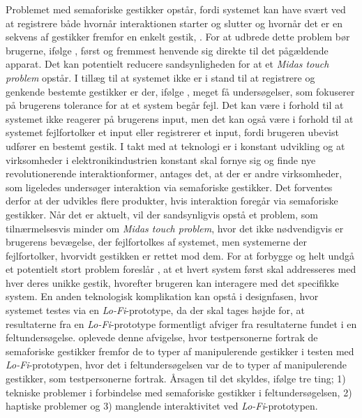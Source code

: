Problemet med semaforiske gestikker opstår, fordi systemet kan have svært ved at registrere både hvornår interaktionen starter og slutter og hvornår det er en sekvens af gestikker fremfor en enkelt gestik, \parencite[s. 27]{PDF:ATaxonomyOfGestures}. For at udbrede dette problem bør brugerne, ifølge \textcite[s. 1]{PDF:DoThatThere}, først og fremmest henvende sig direkte til det pågældende apparat. Det kan potentielt reducere sandsynligheden for at et \textit{Midas touch problem} opstår. I tillæg til at systemet ikke er i stand til at registrere og genkende bestemte gestikker er der, ifølge \textcite[s. 37]{PDF:ATaxonomyOfGestures}, meget få undersøgelser, som fokuserer på brugerens tolerance for at et system begår fejl. Det kan være i forhold til at systemet ikke reagerer på brugerens input, men det kan også være i forhold til at systemet fejlfortolker et input eller registrerer et input, fordi brugeren ubevist udfører en bestemt gestik. \blankline
%
I takt med at teknologi er i konstant udvikling og at virksomheder i elektronikindustrien konstant skal fornye sig og finde nye revolutionerende interaktionformer, antages det, at der er andre virksomheder, som ligeledes undersøger interaktion via semaforiske gestikker. Det forventes derfor at der udvikles flere produkter, hvis interaktion foregår via semaforiske gestikker. Når det er aktuelt, vil der sandsynligvis opstå et problem, som tilnærmelsesvis minder om \textit{Midas touch problem}, hvor det ikke nødvendigvis er brugerens bevægelse, der fejlfortolkes af systemet, men systemerne der fejlfortolker, hvorvidt gestikken er rettet mod dem. For at forbygge og helt undgå et potentielt stort problem foreslår \textcite[s. 2]{PDF:DoThatThere}, at et hvert system først skal addresseres med hver deres unikke gestik, hvorefter brugeren kan interagere med det specifikke system. \blankline
\newpage
%        
En anden teknologisk komplikation kan opstå i designfasen, hvor systemet testes via en \textit{Lo-Fi}-prototype, da der skal tages højde for, at resultaterne fra en \textit{Lo-Fi}-prototype formentligt afviger fra resultaterne fundet i en feltundersøgelse. \textcite[s. 176]{PDF:ComparingInputModalities} oplevede denne afvigelse, hvor testpersonerne fortrak de semaforiske gestikker fremfor de to typer af manipulerende gestikker i testen med \textit{Lo-Fi}-prototypen, hvor det i feltundersøgelsen var de to typer af manipulerende gestikker, som testpersonerne fortrak. Årsagen til det skyldes, ifølge \textcite[s. 176]{PDF:ComparingInputModalities} tre ting; 1) tekniske problemer i forbindelse med semaforiske gestikker i feltundersøgelsen, 2) haptiske problemer og 3) manglende interaktivitet ved \textit{Lo-Fi}-prototypen. 

